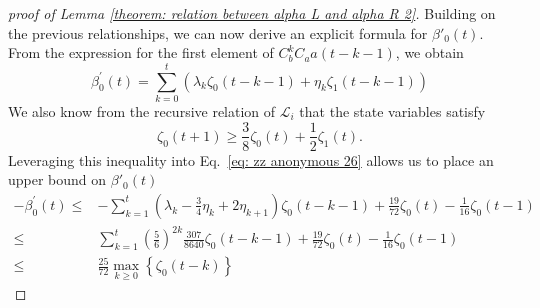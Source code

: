 \documentclass[showpacs,onecolumn,aps,prx,long bibliography,superscriptaddress,notitlepage]{revtex4-1}
\begin{document}
\begin{proof}[proof of Lemma \ref{theorem: relation between alpha L and alpha R 2}]
Building on the previous relationships, we can now derive an explicit formula for $\beta'_0(t)$. From the expression for the first element of $C_b^kC_aa(t-k-1)$, we obtain
\begin{equation}
    \beta_0^{\prime}(t)=\sum_{k=0}^t\left(\lambda_k \zeta_0(t-k-1)+\eta_k \zeta_1(t-k-1)\right)
    \label{eq: zz anonymous 26}
\end{equation}
We also know from the recursive relation of $\mathcal{L}_i$ that the state variables satisfy
\begin{equation}
\zeta_0(t+1) \geq \frac{3}{8} \zeta_0(t)+\frac{1}{2} \zeta_1(t).
\end{equation}
Leveraging this inequality into Eq.~\ref{eq: zz anonymous 26} allows us to place an upper bound on $\beta'_0(t)$
\begin{align}
-\beta_0^{\prime}(t) \leq & -\sum_{k=1}^t\left(\lambda_k-\frac{3}{4} \eta_k+2 \eta_{k+1}\right) \zeta_0(t-k-1)+ \frac{19}{72} \zeta_0(t) - \frac{1}{16}\zeta_0(t-1) \\
\leq & \sum_{k=1}^t\left(\frac{5}{6}\right)^{2 k} \frac{307}{8640} \zeta_0(t-k-1)+ \frac{19}{72} \zeta_0(t) - \frac{1}{16}\zeta_0(t-1) \\
\leq & \frac{25}{72} \max_{k \geq 0}\left\{\zeta_0(t-k)\right\}
\end{align}

    
\end{proof}
\end{document}
